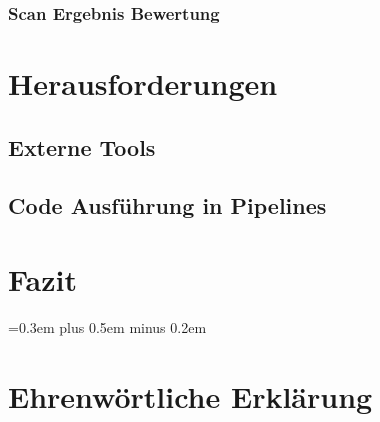 \documentclass[
	12pt, %
	a4paper,
	bibliography=totoc, %
	numbers=noenddot, %
	ngerman, %
	headsepline, %
	oneside %
	]{scrbook} %
\begin{document}
\subsection{Scan Ergebnis Bewertung}\label{subsec:scan_bewertung}


\chapter{Herausforderungen}\label{ch:herausforderungen}


\section{Externe Tools}\label{sec:externe_tools}


\section{Code Ausführung in Pipelines}\label{sec:code_beispiel}


\chapter{Fazit}\label{ch:fazit}


\spaceskip=0.3em plus 0.5em minus 0.2em
\printbibliography


\chapter*{Ehrenwörtliche Erklärung}

\end{document}
